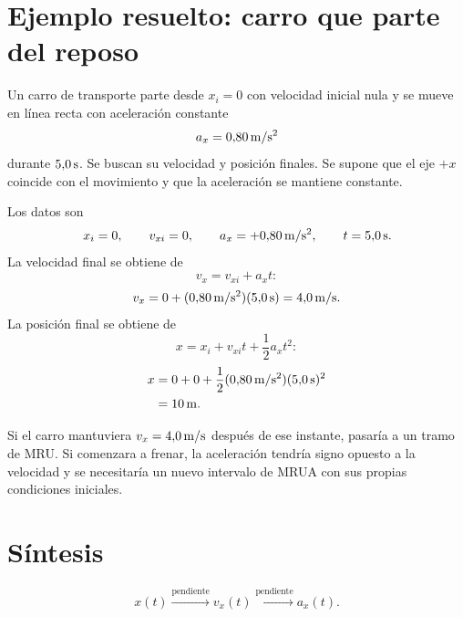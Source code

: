 \documentclass[11pt]{article}
\begin{document}
\section{Ejemplo resuelto: carro que parte del reposo}

Un carro de transporte parte desde \(x_i=0\) con velocidad inicial nula y se
mueve en línea recta con aceleración constante
\[
  a_x=0{,}80\,\mathrm{m/s^2}
\]
durante \(5{,}0\,\mathrm{s}\). Se buscan su velocidad y posición finales. Se
supone que el eje \(+x\) coincide con el movimiento y que la aceleración se
mantiene constante.

Los datos son
\[
  x_i=0,\qquad
  v_{xi}=0,\qquad
  a_x=+0{,}80\,\mathrm{m/s^2},\qquad
  t=5{,}0\,\mathrm{s}.
\]
La velocidad final se obtiene de
\[
  v_x=v_{xi}+a_xt:
\]
\[
  v_x
  =
  0
  +(0{,}80\,\mathrm{m/s^2})(5{,}0\,\mathrm{s})
  =
  4{,}0\,\mathrm{m/s}.
\]
La posición final se obtiene de
\[
  x=x_i+v_{xi}t+\frac12a_xt^2:
\]
\begin{align*}
  x
  &=
  0+0
  +\frac12(0{,}80\,\mathrm{m/s^2})(5{,}0\,\mathrm{s})^2
  \\
  &=10\,\mathrm{m}.
\end{align*}



Si el carro mantuviera \(v_x=4{,}0\,\mathrm{m/s}\) después de ese instante,
pasaría a un tramo de MRU. Si comenzara a frenar, la aceleración tendría signo
opuesto a la velocidad y se necesitaría un nuevo intervalo de MRUA con sus
propias condiciones iniciales.

\section{Síntesis}

\[
  x(t)
  \xrightarrow{\text{pendiente}}
  v_x(t)
  \xrightarrow{\text{pendiente}}
  a_x(t).
\]
\end{document}
